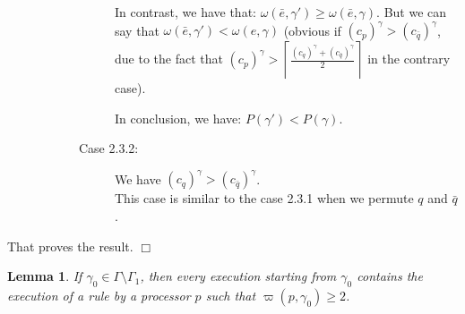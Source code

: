 \documentclass[11pt,english,letterpaper]{article}
\newtheorem{lemma}{Lemma}
\newenvironment{proof}{{\noindent\bf Proof. } }{{\hfill $\Box$}}
\begin{document}
\begin{proof}
\begin{description}
\begin{description}
\begin{description}
In contrast, we have that: $\omega(\bar{e},\gamma')\geq\omega(\bar{e},\gamma)$. But we can say that $\omega(\bar{e},\gamma')<\omega(e,\gamma)$ (obvious if 
$\left(c_{p}\right)^{\gamma}>\left(c_{\bar{q}}\right)^{\gamma}$, due to the fact that
$\left(c_{p}\right)^{\gamma}>\left\lceil\frac{\left(c_{q}\right)^{\gamma}+\left(c_{\bar{q}}\right)^{\gamma}}{2}\right\rceil$ in the contrary case).

In conclusion, we have: $P(\gamma')<P(\gamma)$.
\item[Case 2.3.2:] We have $\left(c_{q}\right)^{\gamma}>\left(c_{\bar{q}}\right)^{\gamma}$.\\
This case is similar to the case 2.3.1 when we permute $q$ and $\bar{q}$.

\end{description}
\end{description}
\end{description}

That proves the result.
\end{proof}
			
\begin{lemma}\label{lem:prelem2ConvergenceChaine}	
If $\gamma_{0}\in\Gamma\setminus\Gamma_{1}$, then every execution starting from $\gamma_{0}$ contains the execution of a rule by a processor $p$ such that $\varpi(p,\gamma_{0})\geq 2$.
\end{lemma}
\end{document}
